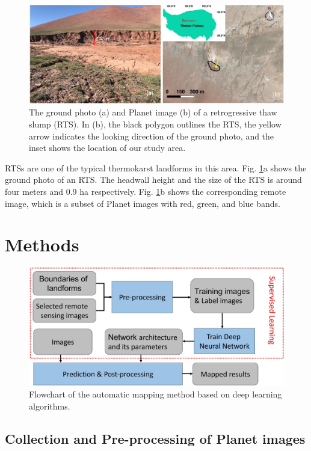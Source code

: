 \documentclass[preprint,12pt,authoryear]{elsarticle}
\begin{document}
\begin{figure}[ht]
	\centering
	\includegraphics[width=14cm]{figures/study_area_loc_RTS_photo_trim.jpg}
	\caption{The ground photo (a) and Planet image (b) of a retrogressive thaw slump (RTS). In (b), the black polygon outlines the RTS, the yellow arrow indicates the looking direction of the ground photo, and the inset shows the location of our study area.}
	\label{fig_rts_groundphoto}
\end{figure}

RTSs are one of the typical thermokarst landforms in this area. Fig. \ref{fig_rts_groundphoto}a shows the ground photo of an RTS. The headwall height and the size of the RTS is around four meters and 0.9 ha respectively. Fig. \ref{fig_rts_groundphoto}b shows the corresponding remote  image, which is a subset of Planet images with red, green, and blue bands. 

\section{Methods}
\label{sec_meth}

\begin{figure}[ht]
	\centering
	\includegraphics[width=12cm]{figures/flowchart_trim.jpg}
	\caption{Flowchart of the automatic mapping method based on deep learning algorithms.}
	\label{fig_flowchart}
\end{figure}

\subsection{Collection and Pre-processing of Planet images}
\label{subsec_collect_images}
\end{document}

